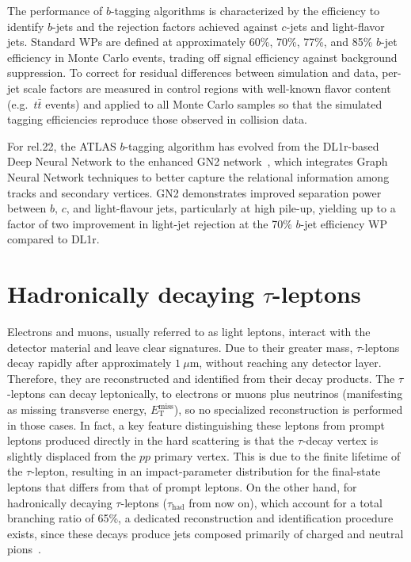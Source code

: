 The performance of $b$-tagging algorithms is characterized by the efficiency to identify $b$-jets and the rejection factors achieved against $c$-jets and light-flavor jets. Standard WPs are defined at approximately 60\%, 70\%, 77\%, and 85\% $b$-jet efficiency in \ttbar Monte Carlo events, trading off signal efficiency against background suppression.  To correct for residual differences between simulation and data, per-jet scale factors are measured in control regions with well-known flavor content (e.g.\ $t\bar t$ events) and applied to all Monte Carlo samples so that the simulated tagging efficiencies reproduce those observed in collision data.

For rel.22, the ATLAS $b$-tagging algorithm has evolved from the DL1r-based Deep Neural Network to the enhanced GN2 network~\cite{new_tagging}, which integrates Graph Neural Network techniques to better capture the relational information among tracks and secondary vertices. GN2 demonstrates improved separation power between \(b\), \(c\), and light-flavour jets, particularly at high pile-up, yielding up to a factor of two improvement in light-jet rejection at the 70\% $b$-jet efficiency WP compared to DL1r.  


\section{Hadronically decaying $\tau$-leptons}
\label{sec:tauhad}
Electrons and muons, usually referred to as light leptons, interact with the detector material and leave clear signatures. Due to their greater mass, \(\tau\)-leptons decay rapidly after approximately \(1\ \mu\mathrm{m}\), without reaching any detector layer. Therefore, they are reconstructed and identified from their decay products. The \(\tau\)-leptons can decay leptonically, to electrons or muons plus neutrinos (manifesting as missing transverse energy, \(E_{\mathrm{T}}^{\mathrm{miss}}\)), so no specialized reconstruction is performed in those cases. 
In fact, a key feature distinguishing these leptons from prompt leptons produced directly in the hard scattering is that the \(\tau\)-decay vertex is slightly displaced from the \(pp\) primary vertex. This is due to the finite lifetime of the \(\tau\)-lepton, resulting in an impact-parameter distribution for the final-state leptons that differs from that of prompt leptons. 
On the other hand, for hadronically decaying \(\tau\)-leptons (\(\tau_{\text{had}}\) from now on), which account for a total branching ratio of 65\%, a dedicated reconstruction and identification procedure exists, since these decays produce jets composed primarily of charged and neutral pions~\cite{PhysRevD.98.030001}.

